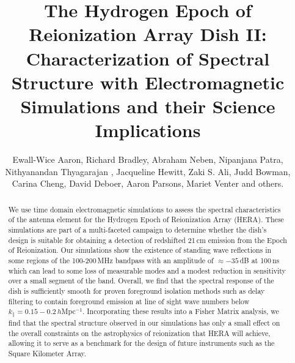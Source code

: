\documentclass[twocolumn]{emulateapj}
\begin{document}
\title{The Hydrogen Epoch of Reionization Array Dish II: Characterization of Spectral Structure with Electromagnetic Simulations and their Science Implications}
\author{
Ewall-Wice Aaron,
Richard Bradley,
Abraham Neben,
Nipanjana Patra,
Nithyanandan Thyagarajan ,
Jacqueline Hewitt,
Zaki S. Ali,
Judd Bowman,
Carina Cheng,
David Deboer,
Aaron Parsons,
Mariet Venter
and others.
}

\begin{abstract}
We use time domain electromagnetic simulations to assess the spectral characteristics of the antenna element for the Hydrogen Epoch of Reionization Array (HERA). These simulations are part of a multi-faceted campaign to determine whether the dish's design is suitable for obtaining a detection of redshifted 21\,cm emission from the Epoch of Reionization. Our simulations show the existence of standing wave reflections in some regions of the 100-200\,MHz bandpass with an amplitude of $\approx -35$\,dB at 100\,ns which can lead to some loss of measurable modes and a modest reduction in sensitivity over a small segment of the band. Overall, we find that the spectral response of the dish is sufficiently smooth for proven foreground isolation methods such as delay filtering to contain foreground emission at line of sight wave numbers below $k_\parallel = 0.15-0.2$\,$h$Mpc$^{-1}$. Incorporating these results into a Fisher Matrix analysis, we find that the spectral structure observed in our simulations has only a small effect on the overall constraints on the astrophysics of reionization that HERA will achieve, allowing it to serve as a benchmark for the design of future instruments such as the Square Kilometer Array. 
\end{abstract}
\end{document}
